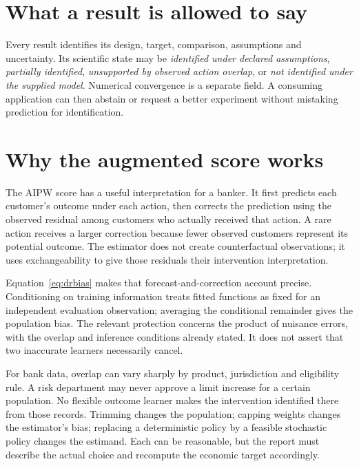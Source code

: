 \section{What a result is allowed to say}
Every result identifies its design, target, comparison, assumptions and
uncertainty. Its scientific state may be \emph{identified under declared
assumptions}, \emph{partially identified}, \emph{unsupported by observed
action overlap}, or \emph{not identified under the supplied model}.
Numerical convergence is a separate field. A consuming application can then
abstain or request a better experiment without mistaking prediction for
identification.

\section{Why the augmented score works}
The AIPW score has a useful interpretation for a banker. It first predicts
each customer's outcome under each action, then corrects the prediction
using the observed residual among customers who actually received that
action. A rare action receives a larger correction because fewer observed
customers represent its potential outcome. The estimator does not create
counterfactual observations; it uses exchangeability to give those residuals
their intervention interpretation.

Equation~\eqref{eq:drbias} makes that forecast-and-correction account
precise. Conditioning on training information treats fitted functions as
fixed for an independent evaluation observation; averaging the conditional
remainder gives the population bias. The relevant protection concerns
the product of nuisance errors, with the overlap and inference conditions
already stated. It does not assert that two inaccurate learners
necessarily cancel.

For bank data, overlap can vary sharply by product, jurisdiction and
eligibility rule. A risk department may never approve a limit increase for
a certain population. No flexible outcome learner makes the intervention
identified there from those records. Trimming changes the population;
capping weights changes the estimator's bias; replacing a deterministic
policy by a feasible stochastic policy changes the estimand. Each can be
reasonable, but the report must describe the actual choice and recompute
the economic target accordingly.

